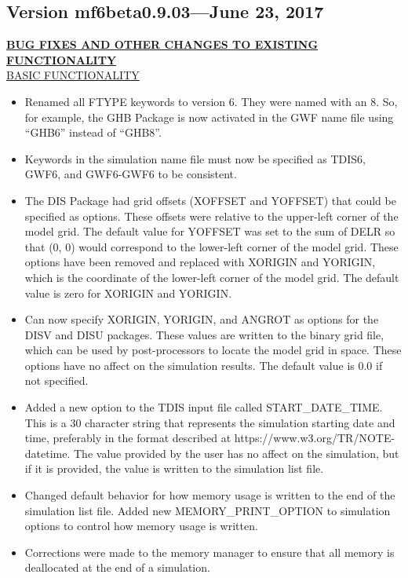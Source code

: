 	\subsection{Version mf6beta0.9.03---June 23, 2017}
	
	\textbf{\underline{BUG FIXES AND OTHER CHANGES TO EXISTING FUNCTIONALITY}} \\
	\underline{BASIC FUNCTIONALITY}
	\begin{itemize}
		\item Renamed all FTYPE keywords to version 6.  They were named with an 8.  So, for example, the GHB Package is now activated in the GWF name file using ``GHB6'' instead of ``GHB8''.
		\item Keywords in the simulation name file must now be specified as TDIS6, GWF6, and GWF6-GWF6 to be consistent.
		\item The DIS Package had grid offsets (XOFFSET and YOFFSET) that could be specified as options.  These offsets were relative to the upper-left corner of the model grid.  The default value for YOFFSET was set to the sum of DELR so that (0, 0) would correspond to the lower-left corner of the model grid.  These options have been removed and replaced with XORIGIN and YORIGIN, which is the coordinate of the lower-left corner of the model grid.  The default value is zero for XORIGIN and YORIGIN.
		\item Can now specify XORIGIN, YORIGIN, and ANGROT as options for the DISV and DISU packages.  These values are written to the binary grid file, which can be used by post-processors to locate the model grid in space.  These options have no affect on the simulation results.  The default value is 0.0 if not specified.
		\item Added a new option to the TDIS input file called START\_DATE\_TIME.  This is a 30 character string that represents the simulation starting date and time, preferably in the format described at https://www.w3.org/TR/NOTE-datetime.  The value provided by the user has no affect on the simulation, but if it is provided, the value is written to the simulation list file.
		\item Changed default behavior for how memory usage is written to the end of the simulation list file.  Added new MEMORY\_PRINT\_OPTION to simulation options to control how memory usage is written.
		\item Corrections were made to the memory manager to ensure that all memory is deallocated at the end of a simulation.
	\end{itemize}
	
